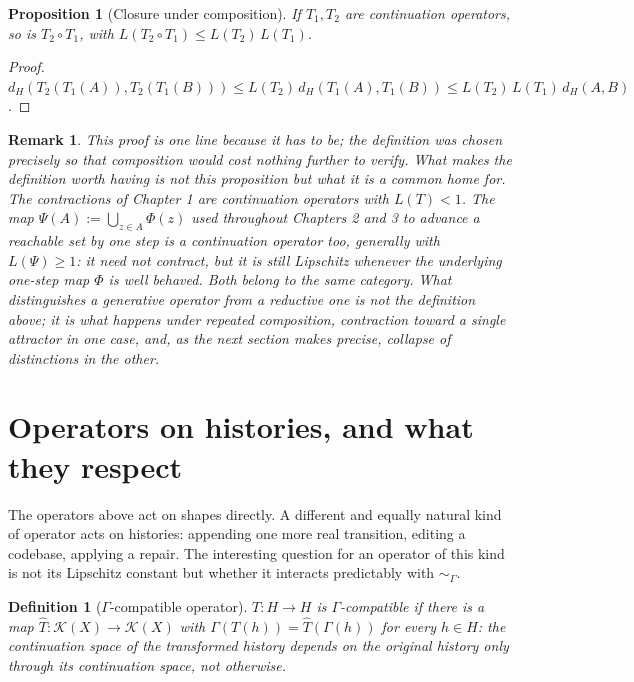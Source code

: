 \documentclass[11pt]{report}
\newtheorem{proposition}{Proposition}[chapter]
\newtheorem{definition}{Definition}[chapter]
\newtheorem{remark}{Remark}[chapter]
\begin{document}
\begin{proposition}[Closure under composition]
\label{prop:closure}
If $T_1, T_2$ are continuation operators, so is $T_2 \circ T_1$, with
$L(T_2 \circ T_1) \leq L(T_2)\, L(T_1)$.
\end{proposition}
\begin{proof}
$d_H(T_2(T_1(A)), T_2(T_1(B))) \leq L(T_2)\, d_H(T_1(A), T_1(B)) \leq
L(T_2)\, L(T_1)\, d_H(A,B)$.
\end{proof}

\begin{remark}
This proof is one line because it has to be; the definition was
chosen precisely so that composition would cost nothing further to
verify. What makes the definition worth having is not this
proposition but what it is a common home for. The contractions of
Chapter 1 are continuation operators with $L(T) < 1$. The map
$\Psi(A) := \bigcup_{z \in A} \Phi(z)$ used throughout Chapters 2 and
3 to advance a reachable set by one step is a continuation operator
too, generally with $L(\Psi) \geq 1$: it need not contract, but it is
still Lipschitz whenever the underlying one-step map $\Phi$ is well
behaved. Both belong to the same category. What distinguishes a
generative operator from a reductive one is not the definition above;
it is what happens under repeated composition, contraction toward a
single attractor in one case, and, as the next section makes precise,
collapse of distinctions in the other.
\end{remark}

\section*{Operators on histories, and what they respect}

The operators above act on shapes directly. A different and equally
natural kind of operator acts on histories: appending one more real
transition, editing a codebase, applying a repair. The interesting
question for an operator of this kind is not its Lipschitz constant
but whether it interacts predictably with $\sim_\Gamma$.

\begin{definition}[$\Gamma$-compatible operator]
$T : H \to H$ is $\Gamma$-compatible if there is a map
$\hat{T} : \mathcal{K}(X) \to \mathcal{K}(X)$ with
$\Gamma(T(h)) = \hat{T}(\Gamma(h))$ for every $h \in H$: the
continuation space of the transformed history depends on the original
history only through its continuation space, not otherwise.
\end{definition}
\end{document}

